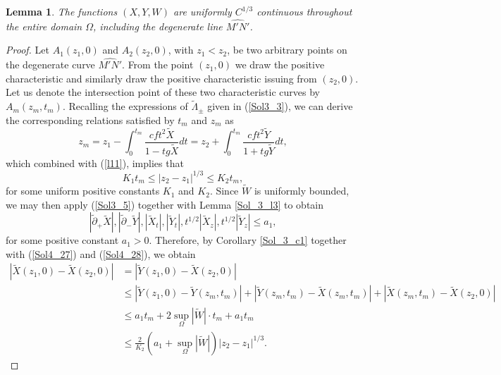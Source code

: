 \documentclass[3p,11pt]{elsarticle}
\numberwithin{equation}{section}
\newtheorem{lemma}{Lemma}[section]
\begin{document}
\begin{lemma}\label{Sol_3_l5}
    The functions $( X, Y,W)$ are uniformly $C^{1/3}$ continuous throughout the entire domain $\Omega$, including the degenerate line $\widehat{M'N'}$.
\end{lemma}
\begin{proof}
    Let $A_{1}(z_{1},0)$ and $A_{2}(z_{2},0)$, with $z_{1}<z_{2}$, be two arbitrary points on the degenerate curve $\widehat{M'N'}$. From the point $(z_{1},0)$ we draw the positive characteristic and similarly draw the positive characteristic issuing from $(z_{2},0)$. Let us denote the intersection point of these two characteristic curves by $A_{m}(z_{m},t_{m})$. Recalling the expressions of $\tilde{\Lambda}_{\pm}$ given in (\ref{Sol3_3}), we can derive the corresponding relations satisfied by $t_{m}$ and $z_{m}$ as
    \begin{equation*}\label{Sol4_26}
        z_m=z_1-\int_0^{t_m} \frac{cft^2\widetilde X}{1-tg\widetilde X} dt=z_2+\int_0^{t_m} \frac{cft^2\widetilde Y}{1+tg\widetilde Y}dt,
    \end{equation*}
    which combined with (\ref{l11}), implies that
    \begin{equation}\label{Sol4_27}
        K_1t_m\leq |z_2-z_1|^{1/3}\leq K_2t_m,
    \end{equation}
    for some uniform positive constants $K_1$ and $K_2$. Since $\widetilde W$ is uniformly bounded, we may then apply (\ref{Sol3_5}) together with Lemma \ref{Sol_3_l3} to obtain
    \begin{equation}\label{Sol4_28}
        |\tilde\partial_+\widetilde X|, |\tilde\partial_-\widetilde Y|, |\widetilde X_t|, |\widetilde Y_t|, t^{1/2}|\widetilde X_z|, t^{1/2}|\widetilde Y_z|\leq {a_1},
    \end{equation}
    for some positive constant $a_{1}>0$. Therefore, by Corollary \ref{Sol_3_c1} together with (\ref{Sol4_27}) and (\ref{Sol4_28}), we obtain
    \begin{equation}\label{Sol4_29}
        \begin{split}
            |\widetilde X(z_1,0)-\widetilde X(z_2,0)|&=|\widetilde Y(z_1,0)-\widetilde X(z_2,0)|\\
            &\leq |\widetilde Y(z_1,0)-\widetilde Y(z_m,t_m)|+|\widetilde Y(z_m,t_m)-\widetilde X(z_m,t_m)|+|\widetilde X(z_m,t_m)-\widetilde X(z_2,0)|\\
            &\leq a_1t_m+2\sup_{\Omega}|\widetilde W|\cdot t_m+ a_1t_m\\
            &\leq \frac{2}{K_2}(a_1+\sup_{\Omega}|\widetilde W|)|z_2-z_1|^{1/3}.

\end{split}
\end{equation}
\end{proof}
\end{document}
